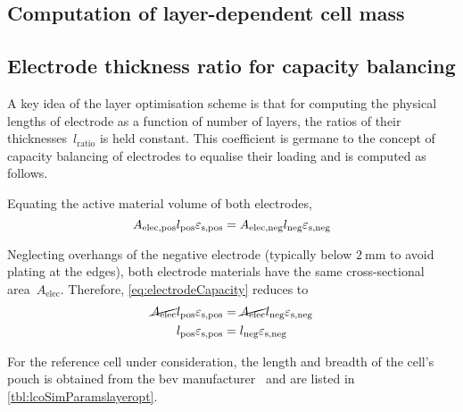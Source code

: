 \subsection{Computation of layer-dependent cell mass}\label{sec:massofonecell}

\subsection{Electrode thickness ratio for capacity balancing}\label{sec:electroderatio}

A key  idea of the layer  optimisation scheme is that  for computing the
physical  lengths  of electrode  as  a  function  of number  of  layers,
the  ratios  of  their thicknesses~$l_\text{ratio}$  is  held  constant.
This  coefficient is  germane to  the concept  of capacity  balancing of
electrodes  to equalise  their loading and is computed as follows.

Equating  the active material volume of both electrodes,
\begin{equation}
    A_\text{elec,pos}l_\text{pos}  \varepsilon_\text{s,pos} = A_\text{elec,neg}l_\text{neg}  \varepsilon_\text{s,neg} \label{eq:electrodeCapacity}\\
\end{equation}

Neglecting  overhangs   of  the  negative  electrode   (typically  below
$\SI{2}{\milli\meter}$ to  avoid plating  at the edges),  both electrode
materials have the same cross-sectional area~$A_\text{elec}$. Therefore,
\cref{eq:electrodeCapacity} reduces to
\begin{align}
    \cancel{A_\text{elec}}l_\text{pos}  \varepsilon_\text{s,pos} & = \cancel{A_\text{elec}}l_\text{neg}  \varepsilon_\text{s,neg}  \\
    l_\text{pos}  \varepsilon_\text{s,pos}                       & = l_\text{neg}  \varepsilon_\text{s,neg}\label{eq:electrodeCapequalarea}
\end{align}

For the reference cell under consideration, the length and breadth of the cell's
pouch is  obtained from the \gls{bev}  manufacturer~\cite{GMBoltBatteryDims} and
are listed in \cref{tbl:lcoSimParamslayeropt}.

